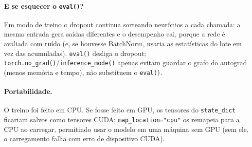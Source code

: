 \documentclass[11pt,a4paper]{article}
\begin{document}
\paragraph{E se esquecer o \texttt{eval()}?} Em modo de treino o dropout continua sorteando neurônios a cada chamada: a mesma
entrada gera saídas diferentes e o desempenho cai, porque a rede é avaliada com ruído (e, se houvesse BatchNorm, usaria as estatísticas
do lote em vez das acumuladas). \texttt{eval()} desliga o dropout; \texttt{torch.no\_grad()}/\texttt{inference\_mode()} apenas evitam
guardar o grafo do autograd (menos memória e tempo), não substituem o \texttt{eval()}.
\begin{table}[H]\centering\scriptsize{}
\caption{Efeito de esquecer \texttt{eval()} (métrica principal na validação).}\label{tab:eval}\end{table}
\paragraph{Portabilidade.} O treino foi feito em CPU. Se fosse feito em GPU, os tensores do \texttt{state\_dict} ficariam
salvos como tensores CUDA; \texttt{map\_location="cpu"} os remapeia para a CPU ao carregar, permitindo usar o modelo em uma máquina sem
GPU (sem ele, o carregamento falha com erro de dispositivo CUDA).

\begin{table}[H]\centering\scriptsize{}
\caption{Desafio opcional: TorchScript (\texttt{torch.jit.trace}) e quantização dinâmica int8 (\texttt{quantize\_dynamic}).}\label{tab:extras}\end{table}
\end{document}
